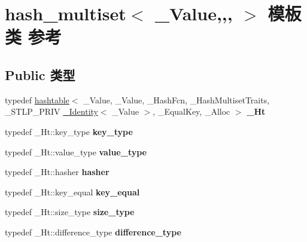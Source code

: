 \hypertarget{classhash__multiset}{}\section{hash\+\_\+multiset$<$ \+\_\+\+Value,,, $>$ 模板类 参考}
\label{classhash__multiset}
\subsection*{Public 类型}
\begin{DoxyCompactItemize}
\item 
\mbox{\label{classhash__multiset_abece2ec674569e2f1f693acd1c2d08e7}} 
typedef \hyperlink{classhashtable}{hashtable}$<$ \+\_\+\+Value, \+\_\+\+Value, \+\_\+\+Hash\+Fcn, \+\_\+\+Hash\+Multiset\+Traits, \+\_\+\+S\+T\+L\+P\+\_\+\+P\+R\+IV \hyperlink{struct___identity}{\+\_\+\+Identity}$<$ \+\_\+\+Value $>$, \+\_\+\+Equal\+Key, \+\_\+\+Alloc $>$ {\bfseries \+\_\+\+Ht}
\item 
\mbox{\label{classhash__multiset_a9cd8553e86e4819db88d7e5228ad74a5}} 
typedef \+\_\+\+Ht\+::key\+\_\+type {\bfseries key\+\_\+type}
\item 
\mbox{\label{classhash__multiset_a1da2b04373113cc17bd0cf2487f99f4c}} 
typedef \+\_\+\+Ht\+::value\+\_\+type {\bfseries value\+\_\+type}
\item 
\mbox{\label{classhash__multiset_a0e35456642f8629d04d0325a65dcfc7b}} 
typedef \+\_\+\+Ht\+::hasher {\bfseries hasher}
\item 
\mbox{\label{classhash__multiset_a8e61bb736e72ddf6b482d83c6f0c5b4e}} 
typedef \+\_\+\+Ht\+::key\+\_\+equal {\bfseries key\+\_\+equal}
\item 
\mbox{\label{classhash__multiset_a87815040509eb97350e3f98d461e998b}} 
typedef \+\_\+\+Ht\+::size\+\_\+type {\bfseries size\+\_\+type}
\item 
\mbox{\label{classhash__multiset_a1bc789964f34082860b0f41c485062e1}} 
typedef \+\_\+\+Ht\+::difference\+\_\+type {\bfseries difference\+\_\+type}

\end{DoxyCompactItemize}
